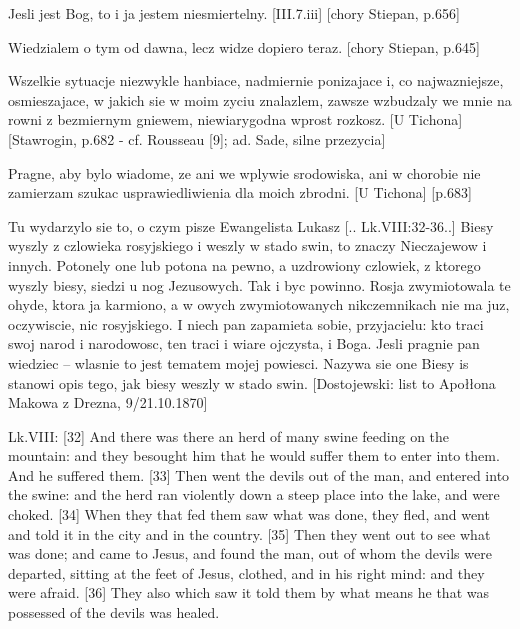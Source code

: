 Jesli jest Bog, to i ja jestem niesmiertelny. [III.7.iii] [chory Stiepan, p.656]

\pa
Wiedzialem o tym od dawna, lecz widze dopiero teraz. [chory Stiepan, p.645]



\pa
Wszelkie sytuacje niezwykle hanbiace, nadmiernie ponizajace i, co najwazniejsze,
osmieszajace, w jakich sie w moim zyciu znalazlem, zawsze wzbudzaly we mnie na
rowni z bezmiernym gniewem, niewiarygodna wprost rozkosz. [U Tichona]
[Stawrogin, p.682 - cf. Rousseau [9]; ad. Sade, silne przezycia]


\pa
Pragne, aby bylo wiadome, ze ani we wplywie srodowiska, ani w chorobie nie
zamierzam szukac usprawiedliwienia dla moich zbrodni. [U Tichona] [p.683]


\pa
Tu wydarzylo sie to, o czym pisze Ewangelista Lukasz [.. Lk.VIII:32-36..]
Biesy wyszly z czlowieka rosyjskiego i weszly w stado swin, to znaczy
Nieczajewow i innych. Potonely one lub potona na pewno, a uzdrowiony czlowiek, z
ktorego wyszly biesy, siedzi u nog Jezusowych. Tak i byc powinno. Rosja
zwymiotowala te ohyde, ktora ja karmiono, a w owych zwymiotowanych nikczemnikach
nie ma juz, oczywiscie, nic rosyjskiego. I niech pan zapamieta sobie,
przyjacielu: kto traci swoj narod i narodowosc, ten traci i wiare ojczysta, i
Boga. Jesli pragnie pan wiedziec -- wlasnie to jest tematem mojej
powiesci. Nazywa sie one Biesy is stanowi opis tego, jak biesy weszly w stado
swin. [Dostojewski: list to Apo{\l}{\l}ona Makowa z Drezna, 9/21.10.1870]


Lk.VIII: 
[32] And there was there an herd of many swine feeding on the mountain: 
and they besought him that he would suffer them to enter into them. And he 
suffered them.
[33] Then went the devils out of the man, and entered into the swine: and 
the herd ran violently down a steep place into the lake, and were choked.
[34] When they that fed them saw what was done, they fled, and went and 
told it in the city and in the country.
[35] Then they went out to see what was done; and came to Jesus, and found 
the man, out of whom the devils were departed, sitting at the feet of 
Jesus, clothed, and in his right mind: and they were afraid.
[36] They also which saw it told them by what means he that was possessed 
of the devils was healed.


